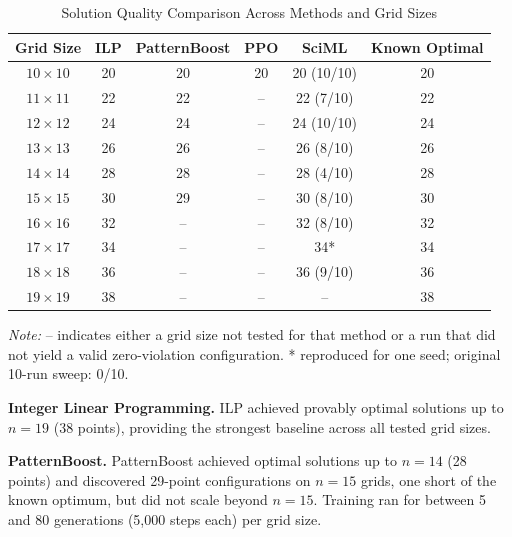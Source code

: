 \documentclass{article}
\theoremstyle{plain}
\theoremstyle{definition}
\theoremstyle{remark}
\begin{document}
\begin{table}[ht]
\vspace{0.1in}
\begin{center}
\begin{footnotesize}
\begin{sc}
\caption{Solution Quality Comparison Across Methods and Grid Sizes}
\label{tab:results_comparison}

\begin{tabular}{cccccc}
\toprule
\textbf{Grid Size} & \textbf{ILP} & \textbf{PatternBoost} & \textbf{PPO} & \textbf{SciML} & \textbf{Known Optimal} \\
\midrule
$10\times 10$ & 20 & 20 & 20 & 20 (10/10) & 20 \\
$11\times 11$ & 22 & 22 & -- & 22 (7/10)  & 22 \\
$12\times 12$ & 24 & 24 & -- & 24 (10/10) & 24 \\
$13\times 13$ & 26 & 26 & -- & 26 (8/10)  & 26 \\
$14\times 14$ & 28 & 28 & -- & 28 (4/10)  & 28 \\
$15\times 15$ & 30 & 29 & -- & 30 (8/10)  & 30 \\
$16\times 16$ & 32 & -- & -- & 32 (8/10)  & 32 \\
$17\times 17$ & 34 & -- & -- & 34*        & 34 \\
$18\times 18$ & 36 & -- & -- & 36 (9/10)  & 36 \\
$19\times 19$ & 38 & -- & -- & -- & 38 \\
\bottomrule
\end{tabular}
\end{sc}
\end{footnotesize}
\end{center}
\vspace{0.1in}
{\footnotesize \textit{Note:} {--} indicates either a grid size not tested for that method or a run that did not yield a valid zero-violation configuration. * reproduced for one seed; original 10-run sweep: 0/10.}
\end{table}

\textbf{Integer Linear Programming.} ILP achieved provably optimal solutions up to $n = 19$ (38 points), providing the strongest baseline across all tested grid sizes.

\textbf{PatternBoost.} PatternBoost achieved optimal solutions up to $n = 14$ (28 points) and discovered 29-point configurations on $n = 15$ grids, one short of the known optimum, but did not scale beyond $n = 15$. Training ran for between 5 and 80 generations (5,000 steps each) per grid size.
\end{document}

